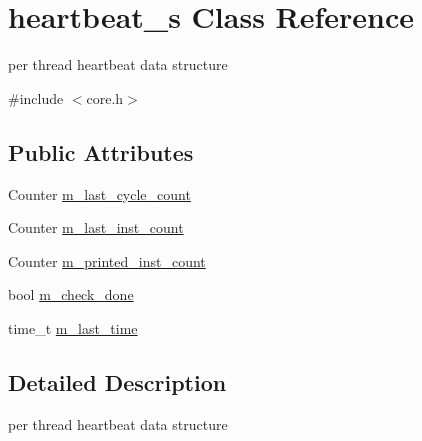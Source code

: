 \hypertarget{classheartbeat__s}{
\section{heartbeat\_\-s Class Reference}
\label{classheartbeat__s}
}


per thread heartbeat data structure  




{\ttfamily \#include $<$core.h$>$}

\subsection*{Public Attributes}
\begin{DoxyCompactItemize}
\item 
Counter \hyperlink{classheartbeat__s_abbd4a34932700b419cf5280c4312cf26}{m\_\-last\_\-cycle\_\-count}
\item 
Counter \hyperlink{classheartbeat__s_ac0d7c13f8059c23889afd5eaef31b1ab}{m\_\-last\_\-inst\_\-count}
\item 
Counter \hyperlink{classheartbeat__s_a7e633443bf9e165d5525f99b3a1e37e8}{m\_\-printed\_\-inst\_\-count}
\item 
bool \hyperlink{classheartbeat__s_a2f60e13291b10f04e59c939a69e4a0c2}{m\_\-check\_\-done}
\item 
time\_\-t \hyperlink{classheartbeat__s_ae4f0ac39db73c478b5e04184ee181f26}{m\_\-last\_\-time}
\end{DoxyCompactItemize}


\subsection{Detailed Description}
per thread heartbeat data structure 

